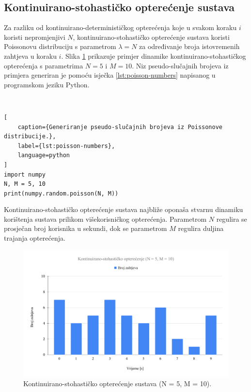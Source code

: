 \documentclass[times, utf8, diplomski]{fer}
\begin{document}
\pagebreak

\subsection{Kontinuirano-stohastičko opterećenje sustava}
Za razliku od kontinuirano-determinističkog opterećenja koje u svakom koraku $i$ koristi nepromjenjivi $N$, kontinuirano-stohastičko opterećenje sustava koristi Poissonovu distribuciju s parametrom $\lambda = N$ za određivanje broja istovremenih zahtjeva u koraku $i$. Slika \ref{fig:cs-load} prikazuje primjer dinamike kontinuirano-stohastičkog opterećenja s parametrima $N=5$ i $M=10$. Niz pseudo-slučajnih brojeva iz primjera generiran je pomoću isječka \ref{lst:poisson-numbers} napisanog u programskom jeziku Python.

\

\begin{lstlisting}[
    caption={Generiranje pseudo-slučajnih brojeva iz Poissonove distribucije.},
    label={lst:poisson-numbers},
    language=python
]
import numpy
N, M = 5, 10
print(numpy.random.poisson(N, M))
\end{lstlisting}

Kontinuirano-stohastičko opterećenje sustava najbliže oponaša stvarnu dinamiku korištenja sustava prilikom višekorisničkog opterećenja. Parametrom $N$ regulira se prosječan broj korisnika u sekundi, dok se parametrom $M$ regulira duljina trajanja opterećenja.

\begin{figure}[htb]
	\centering
	\includegraphics[width=\textwidth]{images/Kontinuirano-stohasticko opterecenje (N = 5, M = 10).pdf}
	\caption{
		Kontinuirano-stohastičko opterećenje sustava (N = 5, M = 10).
	}
	\label{fig:cs-load}
\end{figure}
\end{document}
